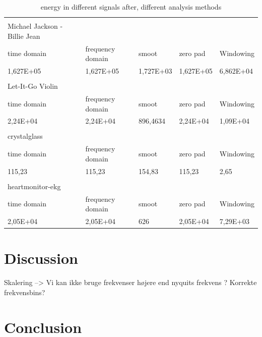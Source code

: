 \begin{table}[]
\begin{tabularx}{\textwidth}{Xllll}
                              &                  &           &           &           \\
Michael Jackson - Billie Jean &                  &           &           &           \\
time domain                   & frequency domain & smoot     & zero pad  & Windowing \\
1,627E+05                     & 1,627E+05        & 1,727E+03 & 1,627E+05 & 6,862E+04 \\
                              &                  &           &           &           \\
Let-It-Go Violin              &                  &           &           &           \\
time domain                   & frequency domain & smoot     & zero pad  & Windowing \\
2,24E+04                      & 2,24E+04         & 896,4634  & 2,24E+04  & 1,09E+04  \\
                              &                  &           &           &           \\
crystalglass                  &                  &           &           &           \\
time domain                   & frequency domain & smoot     & zero pad  & Windowing \\
115,23                        & 115,23           & 154,83    & 115,23    & 2,65      \\
                              &                  &           &           &           \\
heartmonitor-ekg              &                  &           &           &           \\
time domain                   & frequency domain & smoot     & zero pad  & Windowing \\
2,05E+04                      & 2,05E+04         & 626       & 2,05E+04  & 7,29E+03 
\end{tabularx}

\caption{energy in different signals after, different analysis methods }
\label{tab:Energy}
\end{table}

\section{Discussion}

Skalering --> Vi kan ikke bruge frekvenser højere end nyquits frekvens ?
Korrekte frekvensbins?

\section{Conclusion}